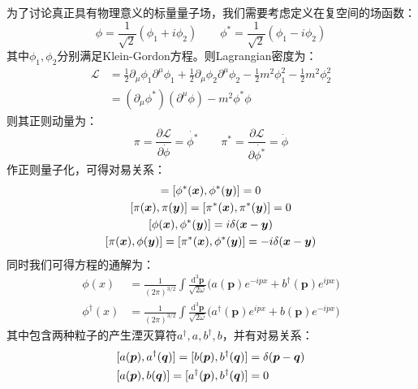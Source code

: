 为了讨论真正具有物理意义的标量量子场，我们需要考虑定义在复空间的场函数：
\begin{equation}
\phi=\frac{1}{\sqrt{2}}(\phi_1+i\phi_2)\qquad\phi^{*}=\frac{1}{\sqrt{2}}(\phi_1-i\phi_2)
\end{equation}
其中$\phi_1,\phi_2$分别满足Klein-Gordon方程。则Lagrangian密度为：
\begin{align}
\mathscr{L}&=\frac{1}{2}\partial_\mu\phi_1\partial^\mu\phi_1+\frac{1}{2}\partial_\mu\phi_2\partial^\mu\phi_2-\frac{1}{2}m^2\phi^2_1-\frac{1}{2}m^2\phi^2_2\\
&=(\partial_\mu\phi^{*})(\partial^\mu\phi)-m^2\phi^{*}\phi\label{eq:lcompscl}
\end{align}
则其正则动量为：
\begin{equation}
\pi=\frac{\partial\mathscr{L}}{\partial\dot{\phi}}=\dot{\phi^*}\qquad\pi^*=\frac{\partial\mathscr{L}}{\partial\dot{\phi^*}}=\dot{\phi}
\end{equation}
作正则量子化，可得对易关系：
\begin{gather}
[\phi(\boldsymbol{x}),\phi(\boldsymbol{y})]=[\phi^{*}(\boldsymbol{x}),\phi^{*}(\boldsymbol{y})]=0\notag\\
[\pi(\boldsymbol{x}),\pi(\boldsymbol{y})]=[\pi^{*}(\boldsymbol{x}),\pi^{*}(\boldsymbol{y})]=0\notag\\
[\phi(\boldsymbol{x}),\phi^{*}(\boldsymbol{y})]=i\delta(\boldsymbol{x}-\boldsymbol{y})\notag\\
[\pi(\boldsymbol{x}),\phi(\boldsymbol{y})]=[\pi^*(\boldsymbol{x}),\phi^*(\boldsymbol{y})]=-i\delta(\boldsymbol{x}-\boldsymbol{y})
\end{gather}
同时我们可得方程的通解为：
\begin{align}
\phi(x)&=\frac{1}{(2\pi)^{3/2}}\int\frac{\mathrm{d}^3\boldsymbol{p}}{\sqrt{2\omega}}\Big(a(\boldsymbol{p})e^{-ipx}+b^{\dagger}(\boldsymbol{p})e^{ipx}\Big)\label{eq:phiaad}\\
\phi^\dagger(x)&=\frac{1}{(2\pi)^{3/2}}\int\frac{\mathrm{d}^3\boldsymbol{p}}{\sqrt{2\omega}}\Big(a^\dagger(\boldsymbol{p})e^{ipx}+b(\boldsymbol{p})e^{-ipx}\Big)
\end{align}
其中包含两种粒子的产生湮灭算符$a^\dagger,a,b^\dagger,b$，并有对易关系：
\begin{align}
&[a(\boldsymbol{p}),a^\dagger(\boldsymbol{q})]=[b(\boldsymbol{p}),b^\dagger(\boldsymbol{q})]=\delta(\boldsymbol{p}-\boldsymbol{q})\notag\\
&[a(\boldsymbol{p}),b(\boldsymbol{q})]=[a^\dagger(\boldsymbol{p}),b^\dagger(\boldsymbol{q})]=0
\end{align}

